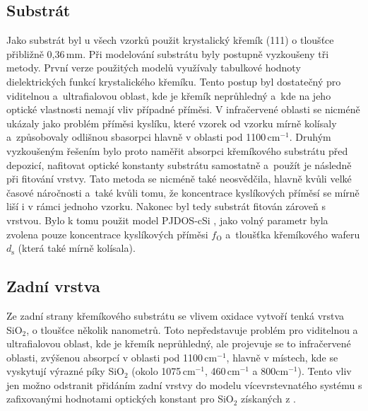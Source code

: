 \subsection{Substrát}
Jako substrát byl u všech vzorků použit krystalický křemík (111) o tloušťce přibližně 0,36\,mm. Při modelování substrátu byly postupně vyzkoušeny tři metody. První verze použitých modelů využívaly tabulkové hodnoty dielektrických funkcí krystalického kře\-mí\-ku. Tento postup byl dostatečný pro viditelnou a~ultrafialovou oblast, kde je křemík neprůhledný a~kde na jeho optické vlastnosti nemají vliv případné příměsi. V infračervené oblasti se nicméně ukázaly jako problém příměsi kyslíku, které vzorek od vzorku mírně kolísaly a~způsobovaly odlišnou sbasorpci hlavně v oblasti pod 1100\,cm$^{-1}$. Druhým vyzkoušeným řešením bylo proto naměřit absorpci křemíkového substrátu před depozicí, nafitovat optické konstanty substrátu samostatně a~použít je následně při fitování vrstvy. Tato metoda se nicméně také neosvědčila, hlavně kvůli velké časové náročnosti a~také kvůli tomu, že koncentrace kyslíkových příměsí se mírně liší i v rámci jednoho vzorku.
Nakonec byl tedy substrát fitován zároveň s vrstvou. Bylo k tomu použit model PJDOS-cSi \cite{}, jako volný parametr byla zvolena pouze koncentrace kyslíkových příměsi $f_\mathrm{O}$ a~tloušťka křemíkového waferu $d_\mathrm{s}$ (která také mírně kolísala).  

\subsection{Zadní vrstva}
Ze zadní strany křemíkového substrátu se vlivem oxidace vytvoří tenká vrstva SiO$_2$, o tloušťce několik nanometrů. Toto nepředstavuje problém pro viditelnou a ultrafialovou oblast, kde je křemík neprůhledný, ale projevuje se to infračervené oblasti, zvýšenou absorpcí v oblasti pod 1100\,cm$^{-1}$, hlavně v místech, kde se vyskytují výrazné píky SiO$_2$ (okolo 1075\,cm$^{-1}$, 460\,cm$^{-1}$ a 800cm$^{-1}$). Tento vliv jen možno odstranit přidáním zadní vrstvy do modelu vícevrstevnatého systému s zafixovanými hodnotami optických konstant pro SiO$_2$ získaných z \cite{palik1985handbook}.

\cleardoublepage

